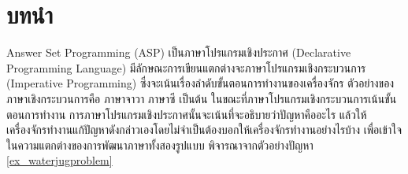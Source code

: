 \chapter{บทนำ}
\par{
Answer Set Programming (ASP) 
เป็นภาษาโปรแกรมเชิงประกาศ 
(Declarative Programming Language)
มีลักษณะการเขียนแตกต่างจะภาษาโปรแกรมเชิงกระบวนการ 
(Imperative Programming) 
ซึ่งจะเน้นเรื่องลำดับขั้นตอนการทำงานของเครื่องจักร 
ตัวอย่างของภาษาเชิงกระบวนการคือ ภาษาจาวา ภาษาซี เป็นต้น
ในขณะที่ภาษาโปรแกรมเชิงกระบวนการเน้นขั้นตอนการทำงาน 
การภาษาโปรแกรมเชิงประกาศนั้นจะเน้นที่จะอธิบายว่าปัญหาคืออะไร 
แล้วให้เครื่องจักรทำงานแก้ปัญหาดังกล่าวเองโดยไม่จำเป็นต้องบอกให้เครื่องจักรทำงานอย่างไรบ้าง
เพื่อเข้าใจในความแตกต่างของการพัฒนาภาษาทั้งสองรูปแบบ 
พิจารณาจากตัวอย่างปัญหา \ref{ex_waterjugproblem}
}
%

